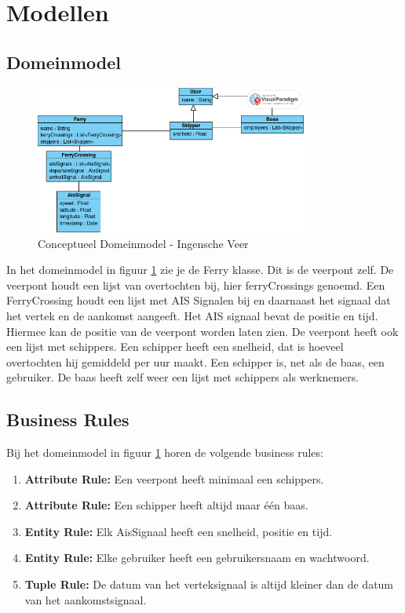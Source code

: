 \documentclass{article}
\begin{document}
\section{Modellen}
\subsection{Domeinmodel}
\begin{figure}[h]
    \centering
    \label{fig:dm}
    \includegraphics[width=0.8\textwidth]{images/ConceptueelKlassendiagram.png}
    \caption{Conceptueel Domeinmodel - Ingensche Veer}
\end{figure}
In het domeinmodel in figuur \ref{fig:dm} zie je de Ferry klasse. Dit is de veerpont zelf. De veerpont houdt een lijst van overtochten bij, hier ferryCrossings genoemd. Een FerryCrossing houdt een lijst met AIS Signalen bij en daarnaast het signaal dat het vertek en de aankomst aangeeft. Het AIS signaal bevat de positie en tijd. Hiermee kan de positie van de veerpont worden laten zien.
De veerpont heeft ook een lijst met schippers. Een schipper heeft een snelheid, dat is hoeveel overtochten hij gemiddeld per uur maakt. Een schipper is, net als de baas, een gebruiker. De baas heeft zelf weer een lijst met schippers als werknemers.

\subsection{Business Rules}
Bij het domeinmodel in  figuur \ref{fig:dm} horen de volgende business rules:
\begin{enumerate}
    \item \textbf{Attribute Rule:} Een veerpont heeft minimaal een schippers.
    \item \textbf{Attribute Rule:} Een schipper heeft altijd maar één baas.
    \item \textbf{Entity Rule:} Elk AisSignaal heeft een snelheid, positie en tijd.
    \item \textbf{Entity Rule:} Elke gebruiker heeft een gebruikersnaam en wachtwoord.
    \item \textbf{Tuple Rule:} De datum van het verteksignaal is altijd kleiner dan de datum van het aankomstsignaal.
\end{enumerate} 
\end{document}

